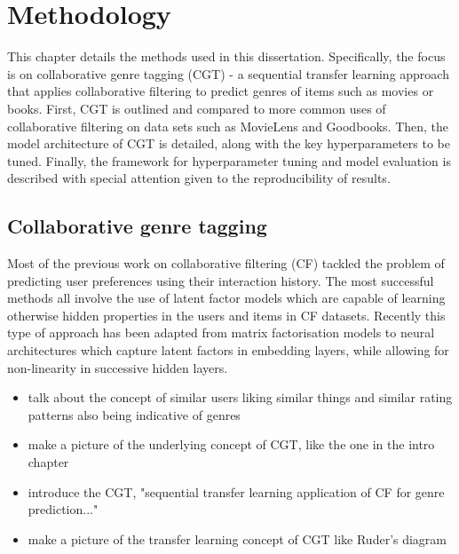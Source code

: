\chapter{Methodology}
This chapter details the methods used in this dissertation. Specifically, the focus is on collaborative genre tagging (CGT) - a sequential transfer learning approach that applies collaborative filtering to predict genres of items such as movies or books. First, CGT is outlined and compared to more common uses of collaborative filtering on data sets such as MovieLens and Goodbooks. Then, the model architecture of CGT is detailed, along with the key hyperparameters to be tuned. Finally, the framework for hyperparameter tuning and model evaluation is described with special attention given to the reproducibility of results.

\section{Collaborative genre tagging}
Most of the previous work on collaborative filtering (CF) tackled the problem of predicting user preferences using their interaction history. The most successful methods all involve the use of latent factor models which are capable of learning otherwise hidden properties in the users and items in CF datasets. Recently this type of approach has been adapted from matrix factorisation models to neural architectures which capture latent factors in embedding layers, while allowing for non-linearity in successive hidden layers.

\begin{itemize}
    \item talk about the concept of similar users liking similar things and similar rating patterns also being indicative of genres
    \item make a picture of the underlying concept of CGT, like the one in the intro chapter
    \item introduce the CGT, "sequential transfer learning application of CF for genre prediction..."
    \item make a picture of the transfer learning concept of CGT like Ruder's diagram
\end{itemize}

